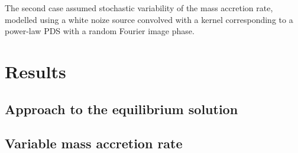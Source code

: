 \documentclass[useAMS,usenatbib,onecolumn,12pt]{mnras}
\begin{document}
The second case assumed stochastic variability of the mass accretion rate, modelled using a white noize source convolved with a kernel corresponding to a power-law PDS with a random Fourier image phase.

\section{Results}

\subsection{Approach to the equilibrium solution}

\subsection{Variable mass accretion rate}




                                              
\end{document}
